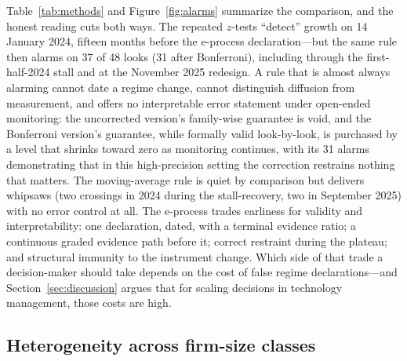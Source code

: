 \documentclass[review,authoryear,12pt]{elsarticle}
\begin{document}
Table~\ref{tab:methods} and Figure~\ref{fig:alarms} summarize the comparison, and the honest reading cuts both ways. The repeated $z$-tests ``detect'' growth on 14 January 2024, fifteen months before the e-process declaration---but the same rule then alarms on 37 of 48 looks (31 after Bonferroni), including through the first-half-2024 stall and at the November 2025 redesign. A rule that is almost always alarming cannot date a regime change, cannot distinguish diffusion from measurement, and offers no interpretable error statement under open-ended monitoring: the uncorrected version's family-wise guarantee is void, and the Bonferroni version's guarantee, while formally valid look-by-look, is purchased by a level that shrinks toward zero as monitoring continues, with its 31 alarms demonstrating that in this high-precision setting the correction restrains nothing that matters. The moving-average rule is quiet by comparison but delivers whipsaws (two crossings in 2024 during the stall-recovery, two in September 2025) with no error control at all. The e-process trades earliness for validity and interpretability: one declaration, dated, with a terminal evidence ratio; a continuous graded evidence path before it; correct restraint during the plateau; and structural immunity to the instrument change. Which side of that trade a decision-maker should take depends on the cost of false regime declarations---and Section~\ref{sec:discussion} argues that for scaling decisions in technology management, those costs are high.

\subsection{Heterogeneity across firm-size classes}
\label{sec:strata}
\end{document}
